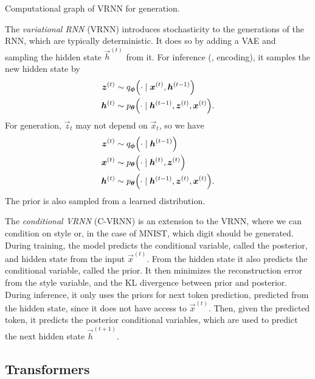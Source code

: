 \begin{marginfigure}
    \centering
    \caption{Computational graph of VRNN for generation.}
    \label{fig:vrnn-generation}
\end{marginfigure}

The \textit{variational RNN} \citep{chung2015recurrent} (VRNN) introduces stochasticity to the
generations of the RNN, which are typically deterministic. It does so by adding a VAE and sampling
the hidden state $\vec{h}^{(t)}$ from it. For inference (\ie, encoding), it samples the new hidden
state by
\begin{align*}
    \vec{z}^{(t)} & \sim q_{\vec{\phi}} \lft( \cdot \mid \vec{x}^{(t)}, \vec{h}^{(t-1)} \rgt)                   \\
    \vec{h}^{(t)} & \sim p_{\vec{\theta}} \lft( \cdot \mid \vec{h}^{(t-1)}, \vec{z}^{(t)}, \vec{x}^{(t)} \rgt).
\end{align*}
For generation, $\vec{z}_t$ may not depend on $\vec{x}_t$, so we have
\begin{align*}
    \vec{z}^{(t)} & \sim q_{\vec{\phi}} \lft( \cdot \mid \vec{h}^{(t-1)} \rgt)                                  \\
    \vec{x}^{(t)} & \sim p_{\vec{\theta}} \lft( \cdot \mid \vec{h}^{(t)}, \vec{z}^{(t)} \rgt)                   \\
    \vec{h}^{(t)} & \sim p_{\vec{\theta}} \lft( \cdot \mid \vec{h}^{(t-1)}, \vec{z}^{(t)}, \vec{x}^{(t)} \rgt).
\end{align*}
The prior is also sampled from a learned distribution.

The \textit{conditional VRNN} (C-VRNN) is an extension to the VRNN, where we can condition on \eg
style or, in the case of MNIST, which digit should be generated. During training, the model
predicts the conditional variable, called the posterior, and hidden state from the input
$\vec{x}^{(t)}$. From the hidden state it also predicts the conditional variable, called the prior.
It then minimizes the reconstruction error from the style variable, and the KL divergence between
prior and posterior. During inference, it only uses the priors for next token prediction, predicted
from the hidden state, since it does not have access to $\vec{x}^{(t)}$. Then, given the predicted
token, it predicts the posterior conditional variables, which are used to predict the next hidden
state $\vec{h}^{(t+1)}$.

\subsection{Transformers}

